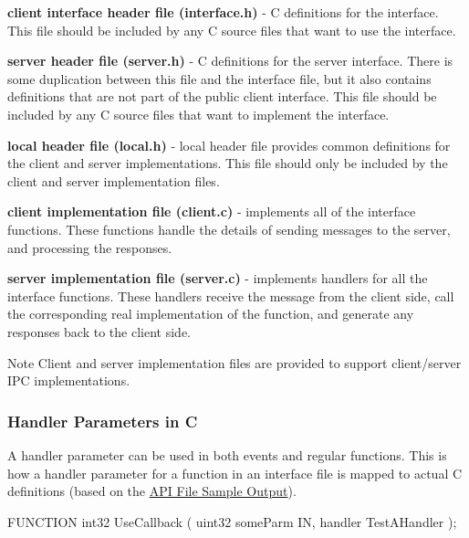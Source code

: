 \begin{DoxyItemize}
\item {\bfseries client interface header file (interface.\+h)} -\/ C definitions for the interface. This file should be included by any C source files that want to use the interface.
\item {\bfseries server header file (server.\+h) } -\/ C definitions for the server interface. There is some duplication between this file and the interface file, but it also contains definitions that are not part of the public client interface. This file should be included by any C source files that want to implement the interface.
\item {\bfseries local header file (local.\+h)} -\/ local header file provides common definitions for the client and server implementations. This file should only be included by the client and server implementation files.
\item {\bfseries client implementation file (client.\+c) } -\/ implements all of the interface functions. These functions handle the details of sending messages to the server, and processing the responses.
\item {\bfseries server implementation file (server.\+c)} -\/ implements handlers for all the interface functions. These handlers receive the message from the client side, call the corresponding real implementation of the function, and generate any responses back to the client side.
\end{DoxyItemize}

\begin{DoxyNote}{Note}
Client and server implementation files are provided to support client/server I\+P\+C implementations.
\end{DoxyNote}
\hypertarget{interface_def_lang_c_interfaceDefLangC_handlerParm}{}\subsubsection{Handler Parameters in C}\label{interface_def_lang_c_interfaceDefLangC_handlerParm}
A handler parameter can be used in both events and regular functions. This is how a handler parameter for a function in an interface file is mapped to actual C definitions (based on the \hyperlink{interface_def_lang_c_interfaceDefLangC_sampleAPI}{A\+P\+I File Sample Output}).

\begin{DoxyVerb}FUNCTION int32 UseCallback
(
    uint32 someParm IN,
    handler TestAHandler
);
\end{DoxyVerb}


